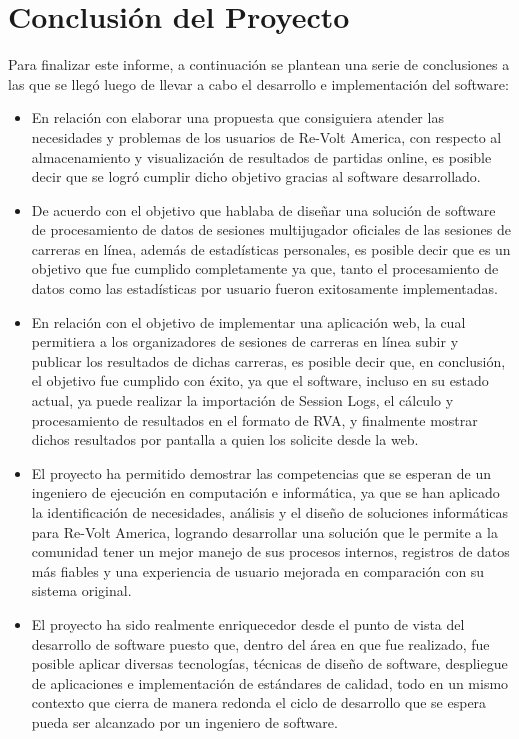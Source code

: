 \chapter{Conclusión del Proyecto}
Para finalizar este informe, a continuación se plantean una serie de conclusiones a las que se llegó luego de llevar a cabo el desarrollo e implementación del software:

\begin{itemize}
	\item En relación con elaborar una propuesta que consiguiera atender las necesidades y problemas de los usuarios de Re-Volt America, con respecto al almacenamiento y visualización de resultados de partidas online, es posible decir que se logró cumplir dicho objetivo gracias al software desarrollado.
	\item De acuerdo con el objetivo que hablaba de diseñar una solución de software de procesamiento de datos de sesiones multijugador oficiales de las sesiones de carreras en línea, además de estadísticas personales, es posible decir que es un objetivo que fue cumplido completamente ya que, tanto el procesamiento de datos como las estadísticas por usuario fueron exitosamente implementadas.
	\item En relación con el objetivo de implementar una aplicación web, la cual permitiera a los organizadores de sesiones de carreras en línea subir y publicar los resultados de dichas carreras, es posible decir que, en conclusión, el objetivo fue cumplido con éxito, ya que el software, incluso en su estado actual, ya puede realizar la importación de Session Logs, el cálculo y procesamiento de resultados en el formato de RVA, y finalmente mostrar dichos resultados por pantalla a quien los solicite desde la web.
	\item El proyecto ha permitido demostrar las competencias que se esperan de un ingeniero de ejecución en computación e informática, ya que se han aplicado la identificación de necesidades, análisis y el diseño de soluciones informáticas para Re-Volt America, logrando desarrollar una solución que le permite a la comunidad tener un mejor manejo de sus procesos internos, registros de datos más fiables y una experiencia de usuario mejorada en comparación con su sistema original. 
	\item El proyecto ha sido realmente enriquecedor desde el punto de vista del desarrollo de software puesto que, dentro del área en que fue realizado, fue posible aplicar diversas tecnologías, técnicas de diseño de software, despliegue de aplicaciones e implementación de estándares de calidad, todo en un mismo contexto que cierra de manera redonda el ciclo de desarrollo que se espera pueda ser alcanzado por un ingeniero de software.
\end{itemize}
